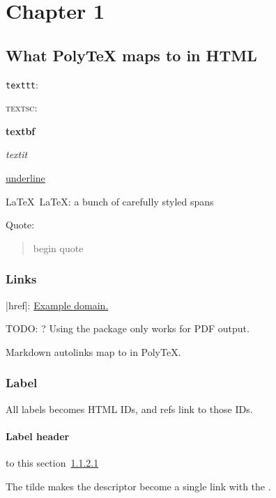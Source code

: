 \chapter{Chapter 1}

\section{What PolyTeX maps to in HTML}

  \texttt{texttt}: 

  \textsc{textsc}: 

  \textbf{textbf}

  \textit{textit}

  \underline{underline}

  \LaTeX\ LaTeX: a bunch of carefully styled spans

  Quote:

  \begin{quote}
  begin quote
  \end{quote}

  \subsection{Links}

    \kode|href|: \href{http://example.com}{Example domain.}

    TODO: ? Using the package only works for PDF output. %

    Markdown autolinks map to  in PolyTeX.


  \subsection{Label}

    All labels becomes HTML IDs, and refs link to those IDs.

    \subsubsection{Label header}\label{label-header}

     to this section~\ref{label-header}

      The tilde makes the descriptor  become a single link with the .

